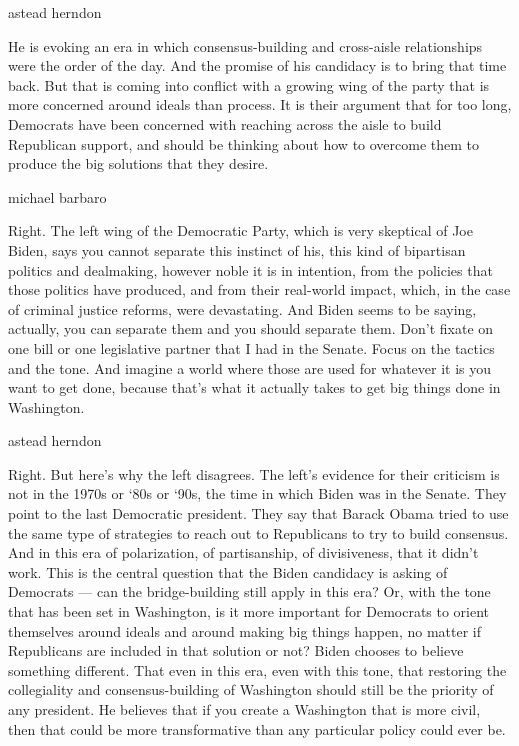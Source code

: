 astead herndon

He is evoking an era in which consensus-building and cross-aisle
relationships were the order of the day. And the promise of his
candidacy is to bring that time back. But that is coming into conflict
with a growing wing of the party that is more concerned around ideals
than process. It is their argument that for too long, Democrats have
been concerned with reaching across the aisle to build Republican
support, and should be thinking about how to overcome them to produce
the big solutions that they desire.

michael barbaro

Right. The left wing of the Democratic Party, which is very skeptical of
Joe Biden, says you cannot separate this instinct of his, this kind of
bipartisan politics and dealmaking, however noble it is in intention,
from the policies that those politics have produced, and from their
real-world impact, which, in the case of criminal justice reforms, were
devastating. And Biden seems to be saying, actually, you can separate
them and you should separate them. Don't fixate on one bill or one
legislative partner that I had in the Senate. Focus on the tactics and
the tone. And imagine a world where those are used for whatever it is
you want to get done, because that's what it actually takes to get big
things done in Washington.

astead herndon

Right. But here's why the left disagrees. The left's evidence for their
criticism is not in the 1970s or `80s or `90s, the time in which Biden
was in the Senate. They point to the last Democratic president. They say
that Barack Obama tried to use the same type of strategies to reach out
to Republicans to try to build consensus. And in this era of
polarization, of partisanship, of divisiveness, that it didn't work.
This is the central question that the Biden candidacy is asking of
Democrats --- can the bridge-building still apply in this era? Or, with
the tone that has been set in Washington, is it more important for
Democrats to orient themselves around ideals and around making big
things happen, no matter if Republicans are included in that solution or
not? Biden chooses to believe something different. That even in this
era, even with this tone, that restoring the collegiality and
consensus-building of Washington should still be the priority of any
president. He believes that if you create a Washington that is more
civil, then that could be more transformative than any particular policy
could ever be.

